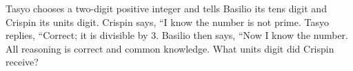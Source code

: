 Tasyo chooses a two-digit positive integer and tells Basilio its tens digit and Crispin its units digit. Crispin says, ``I know the number is not prime. Tasyo replies, ``Correct; it is divisible by $3$. Basilio then says, ``Now I know the number. All reasoning is correct and common knowledge. What units digit did Crispin receive?
